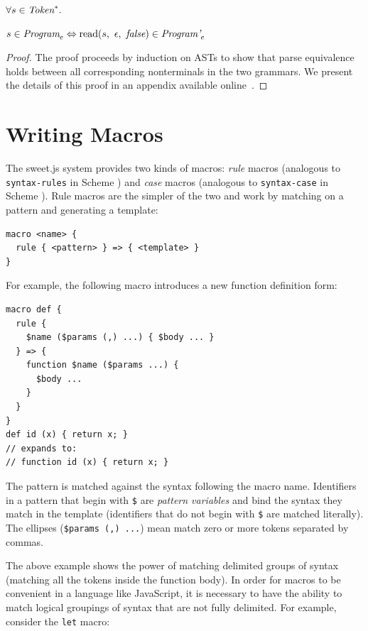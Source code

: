 \documentclass[preprint,10pt]{sigplanconf}
\begin{document}
\begin{theorem}\mbox{}

  \( \forall s \in \textit{Token}^*. \)

  \( s \in \textit{Program}_{e} \Leftrightarrow 
  \textrm{read}(s,~\epsilon,~\textit{false}) \in \textit{Program'}_{e} \)

\end{theorem}
\begin{proof}\mbox{}
  The proof proceeds by induction on ASTs to show that parse
  equivalence holds between all corresponding nonterminals in the two
  grammars. We present the details of this proof in an
  appendix available online~\cite{sweetjsappendix}.
\end{proof}




\section{Writing Macros}
\label{sec:writingMacros}

The sweet.js system provides two kinds of macros: \emph{rule} macros
(analogous to \verb!syntax-rules! in Scheme \cite{Clinger1991})
and \emph{case} macros (analogous to \verb!syntax-case! in
Scheme \cite{Hieb1992}). Rule macros are the simpler of the two and work by matching
on a pattern and generating a template:

\begin{lstlisting}
macro <name> {
  rule { <pattern> } => { <template> }
}
\end{lstlisting}

For example, the following macro introduces a new function definition
form:

\begin{lstlisting}
macro def {
  rule { 
    $name ($params (,) ...) { $body ... } 
  } => {
    function $name ($params ...) {
      $body ...
    }
  }
}
def id (x) { return x; }
// expands to:
// function id (x) { return x; }
\end{lstlisting}

The pattern is matched against the syntax following the macro name.
Identifiers in a pattern that begin with \verb!$! are
\emph{pattern variables} and bind the syntax they match in the
template (identifiers that do not begin with \verb!$! are matched
literally). The ellipses (\verb!$params (,) ...!) mean match zero or more
tokens separated by commas.

The above example shows the power of matching delimited groups of
syntax (\ie matching all the tokens inside the function body). In
order for macros to be convenient in a language like JavaScript, it is
necessary to have the ability to match logical groupings of syntax
that are not fully delimited. For example, consider the
\verb!let! macro:
\end{document}
